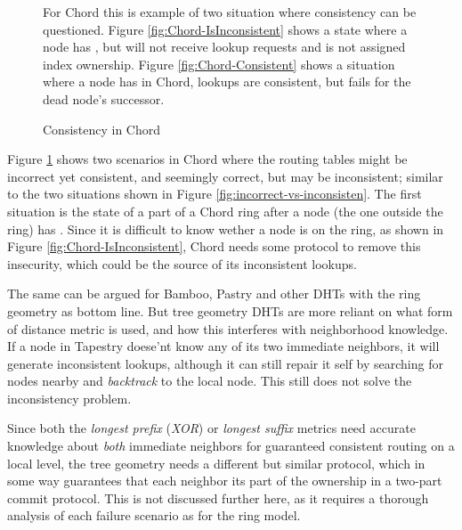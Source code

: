 \begin{figure}[htp] %
\centering
{}
\parbox{.95\linewidth}{ \small
   For Chord this is example of two situation where consistency can be questioned. Figure
    \ref{fig:Chord-IsInconsistent} shows a state where a node has , but
    will not receive lookup requests and is not assigned index ownership. Figure
    \ref{fig:Chord-Consistent} shows a situation where a node has  in Chord,
    lookups are consistent, but fails for the dead node's successor.
}
\caption{Consistency in Chord}\label{fig:Chord-Consistency}
\end{figure}

Figure \ref{fig:Chord-Consistency} shows two scenarios in Chord where the routing tables might be
 incorrect yet consistent, and seemingly correct, but may be inconsistent; similar to the
 two situations shown in Figure \ref{fig:incorrect-vs-inconsisten}. The first situation is the
 state of a part of a Chord ring after a node (the one outside the ring) has .
 Since it is difficult to know wether a node is on the ring, as shown in Figure
 \ref{fig:Chord-IsInconsistent}, Chord needs some protocol to remove this insecurity, which
 could be the source of its inconsistent lookups.

The same can be argued for Bamboo, Pastry and other DHTs with the ring geometry as bottom line.
 But tree geometry DHTs are more reliant on what form of distance metric is used, and how
 this interferes with neighborhood knowledge. If a node in Tapestry doese'nt know any of its two
 immediate neighbors, it will generate inconsistent lookups, although it can still repair it
 self by searching for nodes nearby and \emph{backtrack} to the local node. This still does not
 solve the inconsistency problem.

Since both the \emph{longest prefix} (\emph{XOR}) or \emph{longest suffix} metrics need accurate
 knowledge about \emph{both} immediate neighbors for guaranteed consistent routing on a
 local level, the tree geometry needs a different but similar protocol, which in some
 way guarantees that each neighbor  its part of the ownership in a
 two-part commit protocol. This is not discussed further here, as it requires a
 thorough analysis of each failure scenario as for the ring model.

